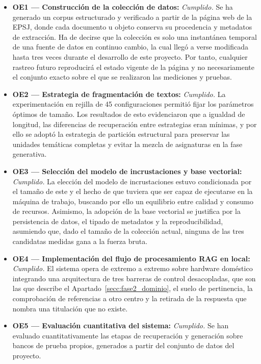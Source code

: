 \begin{itemize}    
  \item \textbf{OE1 --- Construcción de la colección de datos: }
        \textit{Cumplido.} Se ha generado un corpus estructurado y verificado a partir de la página web de la EPSJ, donde cada documento u objeto conserva su procedencia y metadatos de extracción. Ha de decirse que la colección es solo una instantánea temporal de una fuente de datos en continuo cambio, la cual llegó a verse modificada hasta tres veces durante el desarrollo de este proyecto. Por tanto, cualquier rastreo futuro reproducirá el estado vigente de la página y no necesariamente el conjunto exacto sobre el que se realizaron las mediciones y pruebas.
        
  \item \textbf{OE2 --- Estrategia de fragmentación de textos:}
        \textit{Cumplido.} La experimentación en rejilla de 45 configuraciones permitió fijar los parámetros óptimos de tamaño. Los resultados de esto evidenciaron que a igualdad de longitud, las diferencias de recuperación entre estrategias eran mínimas, y por ello se adoptó la estrategia de partición estructural para preservar las unidades temáticas completas y evitar la mezcla de asignaturas en la fase generativa.
        
  \item \textbf{OE3 --- Selección del modelo de incrustaciones y base vectorial: }
        \textit{Cumplido.} La elección del modelo de incrustaciones estuvo condicionada por el tamaño de este y el hecho de que tuviera que ser capaz de ejecutarse en la máquina de trabajo, buscando por ello un equilibrio entre calidad y consumo de recursos. Asimismo, la adopción de la base vectorial se justifica por la persistencia de datos, el tipado de metadatos y la reproducibilidad, asumiendo que, dado el tamaño de la colección actual, ninguna de las tres candidatas medidas gana a la fuerza bruta.
        
  \item \textbf{OE4 --- Implementación del flujo de procesamiento RAG en local:}
        \textit{Cumplido.} El sistema opera de extremo a extremo sobre hardware doméstico integrando una arquitectura de tres barreras de control desacopladas, que son las que describe el Apartado~\ref{secc:fase2_dominio}, el suelo de pertinencia, la
        comprobación de referencias a otro centro y la retirada de la respuesta que nombra
        una titulación que no existe. 
        
  \item \textbf{OE5 --- Evaluación cuantitativa del sistema:} 
        \textit{Cumplido.} Se han evaluado cuantitativamente las etapas de recuperación y generación sobre bancos de prueba propios, generados a partir del conjunto de datos del proyecto.
        

\end{itemize}
